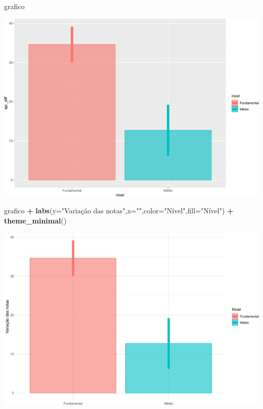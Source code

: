 \documentclass[
  9pt,
  ignorenonframetext,
]{beamer}
\newenvironment{Shaded}{\begin{snugshade}}{\end{snugshade}}
\newcommand{\DataTypeTok}[1]{\textcolor[rgb]{0.13,0.29,0.53}{#1}}
\newcommand{\KeywordTok}[1]{\textcolor[rgb]{0.13,0.29,0.53}{\textbf{#1}}}
\newcommand{\NormalTok}[1]{#1}
\newcommand{\OperatorTok}[1]{\textcolor[rgb]{0.81,0.36,0.00}{\textbf{#1}}}
\newcommand{\StringTok}[1]{\textcolor[rgb]{0.31,0.60,0.02}{#1}}
\begin{document}
\begin{frame}[fragile]{}
\protect\hypertarget{section-7}{}
\begin{Shaded}
\begin{Highlighting}[]
\NormalTok{grafico }
\end{Highlighting}
\end{Shaded}

\includegraphics{aula_06_files/figure-beamer/unnamed-chunk-7-1.pdf}
\end{frame}

\begin{frame}[fragile]{}
\protect\hypertarget{section-8}{}
\begin{Shaded}
\begin{Highlighting}[]
\NormalTok{grafico }\OperatorTok{+}\StringTok{ }\KeywordTok{labs}\NormalTok{(}\DataTypeTok{y=}\StringTok{"Variação das notas"}\NormalTok{,}\DataTypeTok{x=}\StringTok{""}\NormalTok{,}\DataTypeTok{color=}\StringTok{"Nível"}\NormalTok{,}\DataTypeTok{fill=}\StringTok{"Nível"}\NormalTok{) }\OperatorTok{+}\StringTok{ }\KeywordTok{theme\_minimal}\NormalTok{()}
\end{Highlighting}
\end{Shaded}

\includegraphics{aula_06_files/figure-beamer/unnamed-chunk-8-1.pdf}
\end{frame}
\end{document}

